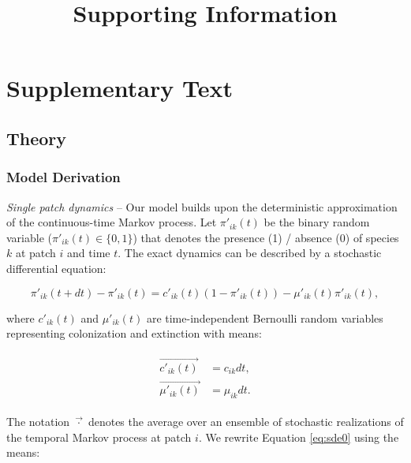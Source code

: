 \documentclass[11pt, class=article, crop=false]{standalone}
\title{Supporting Information}
\date{} %
\begin{document}
\renewcommand{\theequation}{S\arabic{equation}}
\renewcommand{\thefigure}{S\arabic{figure}}

\maketitle

\tableofcontents

\newpage

\section{Supplementary Text}

\subsection{Theory}

\subsubsection{Model Derivation}

\textit{Single patch dynamics} --
Our model builds upon the deterministic approximation of the continuous-time Markov process.
Let $\pi'_{ik}(t)$ be the binary random variable ($\pi'_{ik}(t) \in \{0, 1\}$) that denotes the presence (1) / absence (0) of species $k$ at patch $i$ and time $t$.
The exact dynamics can be described by a stochastic differential equation:

\begin{equation}
    \pi'_{ik}(t + dt) - \pi'_{ik}(t) = c'_{ik}(t) (1 - \pi'_{ik}(t)) - \mu'_{ik}(t) \pi'_{ik}(t),
    \label{eq:sde0}
\end{equation}

where $c'_{ik}(t)$ and $\mu'_{ik}(t)$ are time-independent Bernoulli random variables representing colonization and extinction with means:

\begin{align}
    \begin{split}
        \overrightarrow{c'_{ik}(t)} &= c_{ik} dt,\\
        \overrightarrow{\mu'_{ik}(t)} &= \mu_{ik} dt.
    \end{split}
\end{align}

The notation $\overrightarrow{\cdot}$ denotes the average over an ensemble of stochastic realizations of the temporal Markov process at patch $i$.
We rewrite Equation \ref{eq:sde0} using the means:
\end{document}
